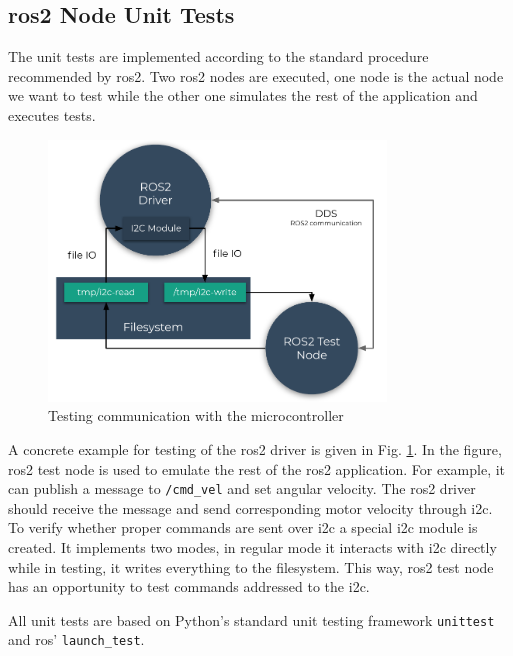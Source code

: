 \subsection{\ac{ros2} Node Unit Tests}

The unit tests are implemented according to the standard procedure recommended by \ac{ros2}. Two \ac{ros2} nodes are executed, one node is the actual node we want to test while the other one simulates the rest of the application and executes tests. 

\begin{figure}[H]
    \centering
    \includegraphics[width=0.8\textwidth]{physical/figures/mocking.pdf}
    \caption{Testing communication with the microcontroller}
    \label{fig:physical:mocking}
\end{figure}

A concrete example for testing of the \ac{ros2} driver is given in Fig. \ref{fig:physical:mocking}. In the figure, \ac{ros2} test node is used to emulate the rest of the \ac{ros2} application. For example, it can publish a message to \texttt{/cmd\_vel} and set angular velocity. The \ac{ros2} driver should receive the message and send corresponding motor velocity through \ac{i2c}. To verify whether proper commands are sent over \ac{i2c} a special \ac{i2c} module is created. It implements two modes, in regular mode it interacts with \ac{i2c} directly while in testing, it writes everything to the filesystem. This way, \ac{ros2} test node has an opportunity to test commands addressed to the \ac{i2c}.

All unit tests are based on Python's standard unit testing framework \texttt{unittest} and \ac{ros}' \texttt{launch\_test}.

